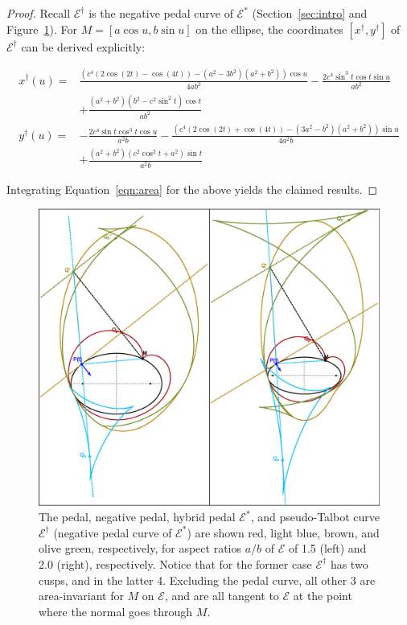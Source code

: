 \begin{proof}
Recall $\mathcal{E}^\dagger$ is the negative pedal curve of $\mathcal{E}^*$ (Section~\ref{sec:intro} and Figure~\ref{fig:hybrid-npc}). For $M=[a\cos u,b\sin u]$ on the ellipse, the coordinates $[x^\dagger,y^\dagger]$ of $\mathcal{E}^\dagger$ can be derived explicitly:

{\small  
\begin{align*}
x^{\dagger}(u)=&\frac{\left(c^4(2\cos(2t) - \cos(4t)) - (a^2 - 3b^2)(a^2 + b^2)\right)\cos{u} }{4 a b^2} - \frac{2c^4 \sin^3t \cos{t} \sin{u}}{a b^2}\\
&+ \frac{(a^2 + b^2)(b^2-c^2\sin^2{t}  )\cos{t}}{a b^2}\\
y^{\dagger}(u)=&-\frac{2c^4 \sin{t} \cos^3{t}\cos{u}}{a^2b} - \frac{(c^4(2\cos(2t) + \cos(4t)) - (3a^2 - b^2)(a^2 + b^2))\sin{u}}{ 4a^2b}\\
&+\frac{  (a^2 + b^2)(c^2 \cos^2{t}    + a^2)\sin{t}}{a^2 b}
\end{align*}
}

Integrating Equation~\eqref{eqn:area} for the above yields the claimed results.
\end{proof}

\begin{figure}
    \centering
    \includegraphics[width=\textwidth]{pics/0060_hybrid_npc.eps}
    \caption{The pedal, negative pedal, hybrid pedal $\mathcal{E}^*$, and pseudo-Talbot curve $\mathcal{E}^\dagger$ (negative pedal curve of $\mathcal{E}^*$) are shown red, light blue, brown, and olive green, respectively, for aspect ratios $a/b$ of $\mathcal{E}$ of 1.5 (left) and 2.0 (right), respectively. Notice that for the former case $\mathcal{E}^\dagger$ has two cusps, and in the latter 4. Excluding the pedal curve, all other 3 are area-invariant for $M$ on $\mathcal{E}$, and are all tangent to $\mathcal{E}$ at the point where the normal goes through $M$.}
    \label{fig:hybrid-npc}
\end{figure}


